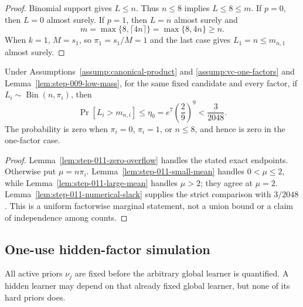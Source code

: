 \begin{proof}
Binomial support gives \(L\le n\).  Thus \(n\le8\) implies
\(L\le8\le m\).  If \(p=0\), then \(L=0\) almost surely.  If \(p=1\),
then \(L=n\) almost surely and
\begin{equation}\label{eq:step-011-p-one-budget}
m=\max\{8,\lceil4n\rceil\}=\max\{8,4n\}\ge n.
\end{equation}
When \(k=1\), \(M=s_1\), so \(\pi_1=s_1/M=1\) and the last case gives
\(L_1=n\le m_{n,1}\) almost surely.
\end{proof}

\begin{proposition}
\label{prop:step-011-overflow-certificate}
Under Assumptions~\ref{assump:canonical-product} and
\ref{assump:vc-one-factors} and Lemma~\ref{lem:step-009-low-mass}, for the
same fixed candidate and every factor, if
\(L_i\sim\operatorname{Bin}(n,\pi_i)\), then
\begin{equation}\label{eq:step-011-final-overflow}
\Pr[L_i>m_{n,i}]
\le\eta_0=e^7\left(\frac29\right)^9
<\frac3{2048}.
\end{equation}
The probability is zero when \(\pi_i=0\), \(\pi_i=1\), or \(n\le8\),
and hence is zero in the one-factor case.
\end{proposition}

\begin{proof}
Lemma~\ref{lem:step-011-zero-overflow} handles the stated exact endpoints.
Otherwise put \(\mu=n\pi_i\).  Lemma~\ref{lem:step-011-small-mean}
handles \(0<\mu\le2\), while Lemma~\ref{lem:step-011-large-mean} handles
\(\mu>2\); they agree at \(\mu=2\).  Lemma~\ref{lem:step-011-numerical-slack}
supplies the strict comparison with \(3/2048\).  This is a uniform
factorwise marginal statement, not a union bound or a claim of independence
among counts.
\end{proof}

\subsection{One-use hidden-factor simulation}
\label{app:step-012}

All active priors \(\nu_j\) are fixed before the arbitrary global learner
is quantified.  A hidden learner may depend on that already fixed global
learner, but none of its hard priors does.

